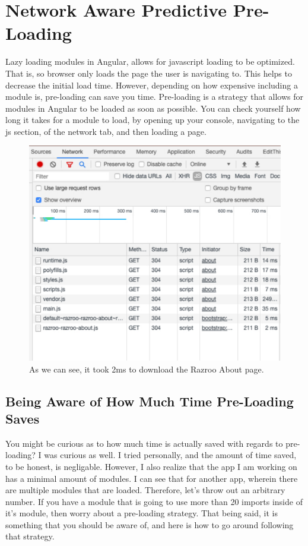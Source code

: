 \chapter{ Network Aware Predictive Pre-Loading }

Lazy loading modules in Angular, allows for javascript loading to be optimized. 
That is, so browser only loads the page the user is navigating to. This helps to
decrease the initial load time. However, depending on how expensive including a
module is, pre-loading can save you time. Pre-loading is a strategy that allows
for modules in Angular to be loaded as soon as possible. You can check yourself 
how long it takes for a module to load, by opening up your console, navigating 
to the js section, of the network tab, and then loading a page. 

\begin{figure}[h]
\includegraphics[width=414pt]{architecture/lazy-loading/network-aware-preloading/network-preloading-console-screenshot.pdf}
\caption{As we can see, it took 2ms to download the Razroo About page.}
\end{figure}

\section{ Being Aware of How Much Time Pre-Loading Saves }
You might be curious as to how much time is actually saved with regards to 
pre-loading? I was curious as well. I tried personally, and the amount of 
time saved, to be honest, is negligable. However, I also realize that the 
app I am working on has a minimal amount of modules. I can see that for 
another app, wherein there are multiple modules that are loaded. Therefore, 
let's throw out an arbitrary number. If you have a module that is going to 
use more than 20 imports inside of it's module, then worry about a pre-loading 
strategy. That being said, it is something that you should be aware of, and
here is how to go around following that strategy. 

